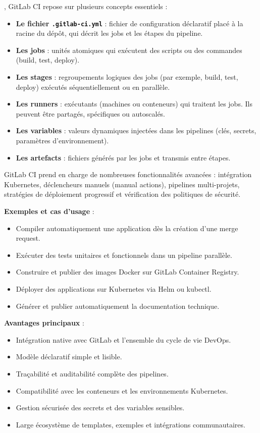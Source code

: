 , GitLab CI repose sur plusieurs concepts essentiels  :
\begin{itemize}
	\item \textbf{Le fichier \texttt{.gitlab-ci.yml}}  : fichier de configuration déclaratif placé à la racine du dépôt, qui décrit les jobs et les étapes du pipeline.
	\item \textbf{Les jobs}  : unités atomiques qui exécutent des scripts ou des commandes (build, test, deploy).
	\item \textbf{Les stages}  : regroupements logiques des jobs (par exemple, build, test, deploy) exécutés séquentiellement ou en parallèle.
	\item \textbf{Les runners}  : exécutants (machines ou conteneurs) qui traitent les jobs. Ils peuvent être partagés, spécifiques ou autoscalés.
	\item \textbf{Les variables}  : valeurs dynamiques injectées dans les pipelines (clés, secrets, paramètres d’environnement).
	\item \textbf{Les artefacts}  : fichiers générés par les jobs et transmis entre étapes.
\end{itemize}

GitLab CI prend en charge de nombreuses fonctionnalités avancées  : intégration Kubernetes, déclencheurs manuels (manual actions), pipelines multi-projets, stratégies de déploiement progressif et vérification des politiques de sécurité.

\textbf{Exemples et cas d’usage} :
\begin{itemize}
	\item Compiler automatiquement une application dès la création d’une merge request.
	\item Exécuter des tests unitaires et fonctionnels dans un pipeline parallèle.
	\item Construire et publier des images Docker sur GitLab Container Registry.
	\item Déployer des applications sur Kubernetes via Helm ou kubectl.
	\item Générer et publier automatiquement la documentation technique.
\end{itemize}

\textbf{Avantages principaux} :
\begin{itemize}
	\item Intégration native avec GitLab et l’ensemble du cycle de vie DevOps.
	\item Modèle déclaratif simple et lisible.
	\item Traçabilité et auditabilité complète des pipelines.
	\item Compatibilité avec les conteneurs et les environnements Kubernetes.
	\item Gestion sécurisée des secrets et des variables sensibles.
	\item Large écosystème de templates, exemples et intégrations communautaires.
\end{itemize}

